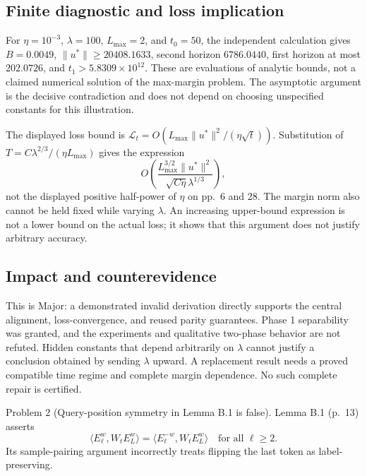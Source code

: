\documentclass[10pt]{article}
\begin{document}
\subsection*{Finite diagnostic and loss implication}
For \(\eta=10^{-3}\), \(\lambda=100\), \(L_{\max}=2\), and \(t_0=50\), the independent calculation gives \(B=0.0049\), \(\|u^\ast\|\ge20408.1633\), second horizon \(6786.0440\), first horizon at most \(202.0726\), and \(t_1>5.8309\times10^{12}\). These are evaluations of analytic bounds, not a claimed numerical solution of the max-margin problem. The asymptotic argument is the decisive contradiction and does not depend on choosing unspecified constants for this illustration.\par
The displayed loss bound is \(\mathcal L_t=O(L_{\max}\|u^\ast\|^2/(\eta\sqrt t))\). Substitution of \(T=C\lambda^{2/3}/(\eta L_{\max})\) gives the expression \[O\!\left(
\frac{L_{\max}^{3/2}\|u^\ast\|^2}
{\sqrt{C\eta}\lambda^{1/3}}
\right),\] not the displayed positive half-power of \(\eta\) on pp. 6 and 28. The margin norm also cannot be held fixed while varying \(\lambda\). An increasing upper-bound expression is not a lower bound on the actual loss; it shows that this argument does not justify arbitrary accuracy.\par
\subsection*{Impact and counterevidence}
This is Major: a demonstrated invalid derivation directly supports the central alignment, loss-convergence, and reused parity guarantees. Phase 1 separability was granted, and the experiments and qualitative two-phase behavior are not refuted. Hidden constants that depend arbitrarily on \(\lambda\) cannot justify a conclusion obtained by sending \(\lambda\) upward. A replacement result needs a proved compatible time regime and complete margin dependence. No such complete repair is certified.\par
Problem 2 (Query-position symmetry in Lemma B.1 is false).  Lemma B.1 (p. 13) asserts \[\langle E_\ell^w,W_tE_L^w\rangle
=\langle E_\ell^{-w},W_tE_L^w\rangle
\quad\text{for all }\ell\ge2.\] Its sample-pairing argument incorrectly treats flipping the last token as label-preserving.\par
\end{document}
